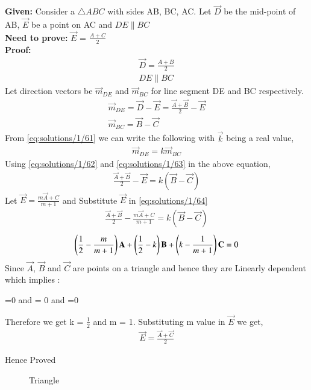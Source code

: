 
\textbf{Given:} Consider a $\triangle{ABC}$ with sides AB, BC, AC. Let $\vec{D}$ be the mid-point of AB, $\vec{E}$ be a point on AC and $DE\parallel{BC}$\\
\textbf{Need to prove:} $\vec{E}$ = $ \frac{A+C}{2}$\\
\textbf{Proof:}
\begin{align}
\vec{D} = \frac{A+B}{2} \\
DE\parallel{BC}\label{eq:solutions/1/61}
\end{align}
Let direction vectors be  $\vec{m}_{DE}$ and  $\vec{m}_{BC}$ for line segment DE and BC respectively.
\begin{align}
 \vec{m}_{DE} = \vec{D} - \vec{E} = \frac{\vec{A}+\vec{B}}{2}-\vec{E} \label{eq:solutions/1/62}\\
 \vec{m}_{BC} = \vec{B}-\vec{C}\label{eq:solutions/1/63}
\end{align}
From \eqref{eq:solutions/1/61} we can write the following with $\vec{k}$ being a real value,
\begin{align}
 \vec{m}_{DE} = k \vec{m}_{BC} \label{eq:solutions/1/64}
\end{align} 
Using \eqref{eq:solutions/1/62} and \eqref{eq:solutions/1/63} in the above equation,
\begin{align}
\frac{\vec{A}+\vec{B}}{2}-\vec{E} = k (\vec{B}-\vec{C}) \label{eq:solutions/1/64}
\end{align}
Let $\vec{E} = \frac{m\vec{A}+C}{m+1} \label{eq:solutions/1/65}$ and Substitute $\vec{E}$ in \eqref{eq:solutions/1/64}
\begin{align}
\frac{\vec{A}+\vec{B}}{2}- \frac{m\vec{A}+C}{m+1} = k(\vec{B}-\vec{C})
\end{align}
\begin{align}
\left(\frac{1}{2}-\frac{m}{m+1}\right)\mathbf{A}+\left(\frac{1}{2}-k\right)\mathbf{B}+\left(k-\frac{1}{m+1}\right)\mathbf{C} = 0
\end{align}
Since $\vec{A}$, $\vec{B}$ and $\vec{C}$ are points on a triangle and hence they are Linearly dependent which implies :
\begin{center}
=0 and  = 0 and  =0 
\end{center}
Therefore we get k = $\frac{1}{2}$ and m = 1.
Substituting m value in $\vec{E}$ we get,
\begin{align}
\vec{E} =  \frac{\vec{A}+\vec{C}}{2}
\end{align} 
\begin{center}
Hence Proved
\end{center}

\begin{figure}[!ht]
\centering
\resizebox{\columnwidth}{!}{}
\caption{Triangle}
\label{fig:Triangle}
\end{figure}

